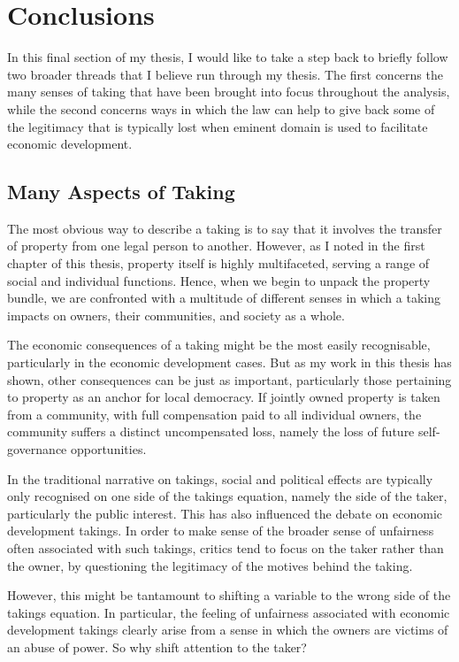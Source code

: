 \chapter{Conclusions}

In this final section of my thesis, I would like to take a step back to briefly follow two broader threads that I believe run through my thesis. The first concerns the many senses of taking that have been brought into focus throughout the analysis, while the second concerns ways in which the law can help to give back some of the legitimacy that is typically lost when eminent domain is used to facilitate economic development.

\section{Many Aspects of Taking}

The most obvious way to describe a taking is to say that it involves the transfer of property from one legal person to another. However, as I noted in the first chapter of this thesis, property itself is highly multifaceted, serving a range of social and individual functions. Hence, when we begin to unpack the property bundle, we are confronted with a multitude of different senses in which a taking impacts on owners, their communities, and society as a whole.

The economic consequences of a taking might be the most easily recognisable, particularly in the economic development cases. But as my work in this thesis has shown, other consequences can be just as important, particularly those pertaining to property as an anchor for local democracy. If jointly owned property is taken from a community, with full compensation paid to all individual owners, the community suffers a distinct uncompensated loss, namely the loss of future self-governance opportunities.

In the traditional narrative on takings, social and political effects are typically only recognised on one side of the takings equation, namely the side of the taker, particularly the public interest. This has also influenced the debate on economic development takings. In order to make sense of the broader sense of unfairness often associated with such takings, critics tend to focus on the taker rather than the owner, by questioning the legitimacy of the motives behind the taking.

However, this might be tantamount to shifting a variable to the wrong side of the takings equation. In particular, the feeling of unfairness associated with economic development takings clearly arise from a sense in which the owners are victims of an abuse of power. So why shift attention to the taker? 


